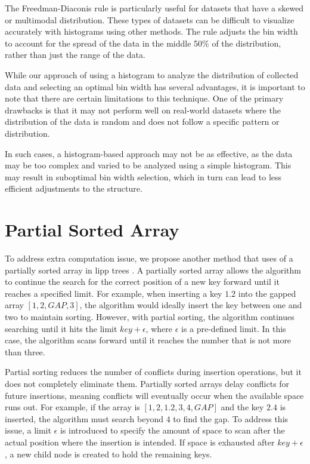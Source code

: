 The Freedman-Diaconis rule is particularly useful for datasets that have a skewed or multimodal distribution. These types of datasets can be difficult to visualize accurately with histograms using other methods. The rule adjusts the bin width to account for the spread of the data in the middle 50\% of the distribution, rather than just the range of the data. 

While our approach of using a histogram to analyze the distribution of collected data and selecting an optimal bin width has several advantages, it is important to note that there are certain limitations to this technique. One of the primary drawbacks is that it may not perform well on real-world datasets where the distribution of the data is random and does not follow a specific pattern or distribution.

In such cases, a histogram-based approach may not be as effective, as the data may be too complex and varied to be analyzed using a simple histogram. This may result in suboptimal bin width selection, which in turn can lead to less efficient adjustments to the \learnindex structure.



\section{Partial Sorted Array} \label{partialsorted}
To address extra computation issue, we propose another method that uses of a partially sorted array in \acrshort{lipp} trees \cite{partialMonotonic}. A partially sorted array allows the algorithm to continue the search for the correct position of a new key forward until it reaches a specified limit. For example, when inserting a key $1.2$ into the gapped array $[1,2, GAP,3]$, the algorithm would ideally insert the key between one and two to maintain sorting. However, with partial sorting, the algorithm continues searching until it hits the limit $key+\epsilon$, where $\epsilon$ is a pre-defined limit. In this case, the algorithm scans forward until it reaches the number that is not more than three.

Partial sorting reduces the number of conflicts during insertion operations, but it does not completely eliminate them. Partially sorted arrays delay conflicts for future insertions, meaning conflicts will eventually occur when the available space runs out. For example, if the array is $[1,2,1.2,3,4, GAP]$ and the key $2.4$ is inserted, the algorithm must search beyond $4$ to find the gap. To address this issue, a limit $\epsilon$ is introduced to specify the amount of space to scan after the actual position where the insertion is intended. If space is exhausted after $key + \epsilon$, a new child node is created to hold the remaining keys.

